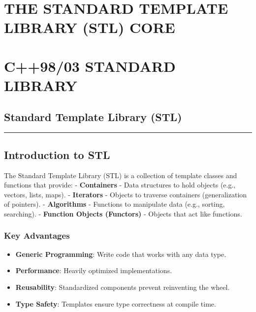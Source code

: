 \hypertarget{the-standard-template-library-stl-core}{%
\chapter{THE STANDARD TEMPLATE LIBRARY (STL)
CORE}\label{the-standard-template-library-stl-core}}

\hypertarget{c9803-standard-library}{%
\chapter{C++98/03 STANDARD LIBRARY}\label{c9803-standard-library}}

\hypertarget{standard-template-library-stl}{%
\section{Standard Template Library
(STL)}\label{standard-template-library-stl}}

\begin{center}\rule{0.5\linewidth}{0.5pt}\end{center}

\hypertarget{introduction-to-stl}{%
\section{Introduction to STL}\label{introduction-to-stl}}

The Standard Template Library (STL) is a collection of template classes
and functions that provide: - \textbf{Containers} - Data structures to
hold objects (e.g., vectors, lists, maps). - \textbf{Iterators} -
Objects to traverse containers (generalization of pointers). -
\textbf{Algorithms} - Functions to manipulate data (e.g., sorting,
searching). - \textbf{Function Objects (Functors)} - Objects that act
like functions.

\hypertarget{key-advantages}{%
\subsection{Key Advantages}\label{key-advantages}}

\begin{itemize}
\tightlist
\item
  \textbf{Generic Programming}: Write code that works with any data
  type.
\item
  \textbf{Performance}: Heavily optimized implementations.
\item
  \textbf{Reusability}: Standardized components prevent reinventing the
  wheel.
\item
  \textbf{Type Safety}: Templates ensure type correctness at compile
  time.
\end{itemize}

